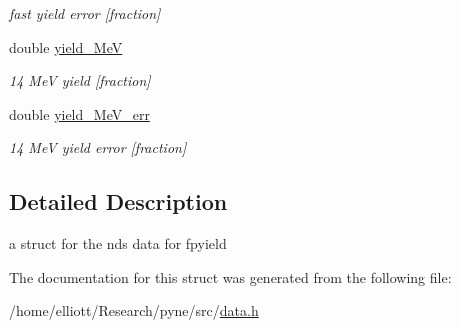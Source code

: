 \begin{DoxyCompactItemize}
\begin{DoxyCompactList}\small\item\em fast yield error \mbox{[}fraction\mbox{]} \end{DoxyCompactList}\item 
\hypertarget{structpyne_1_1ndsfpysub_afb3737be03fedddc6f54fa3a0e59f0e8}{double \hyperlink{structpyne_1_1ndsfpysub_afb3737be03fedddc6f54fa3a0e59f0e8}{yield\-\_\-Me\-V}}\label{structpyne_1_1ndsfpysub_afb3737be03fedddc6f54fa3a0e59f0e8}

\begin{DoxyCompactList}\small\item\em 14 Me\-V yield \mbox{[}fraction\mbox{]} \end{DoxyCompactList}\item 
\hypertarget{structpyne_1_1ndsfpysub_a7bc2487245689a3f6a095f2254e66e99}{double \hyperlink{structpyne_1_1ndsfpysub_a7bc2487245689a3f6a095f2254e66e99}{yield\-\_\-Me\-V\-\_\-err}}\label{structpyne_1_1ndsfpysub_a7bc2487245689a3f6a095f2254e66e99}

\begin{DoxyCompactList}\small\item\em 14 Me\-V yield error \mbox{[}fraction\mbox{]} \end{DoxyCompactList}\end{DoxyCompactItemize}


\subsection{Detailed Description}
a struct for the nds data for fpyield 

The documentation for this struct was generated from the following file\-:\begin{DoxyCompactItemize}
\item 
/home/elliott/\-Research/pyne/src/\hyperlink{data_8h}{data.\-h}\end{DoxyCompactItemize}
